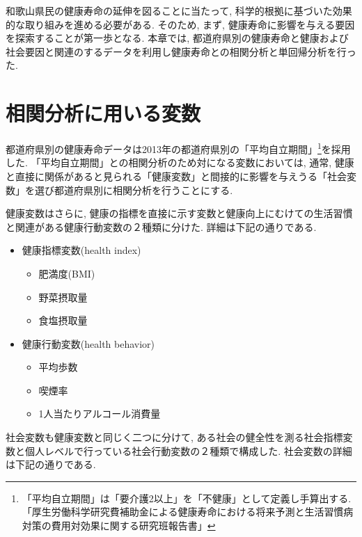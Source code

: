 和歌山県民の健康寿命の延伸を図ることに当たって, 科学的根拠に基づいた効果的な取り組みを進める必要がある. そのため, まず, 健康寿命に影響を与える要因を探索することが第一歩となる.
本章では, 都道府県別の健康寿命と健康および社会要因と関連のするデータを利用し健康寿命との相関分析と単回帰分析を行った.

\section{相関分析に用いる変数}
都道府県別の健康寿命データは2013年の都道府県別の「平均自立期間」\footnote{「平均自立期間」は「要介護2以上」を「不健康」として定義し手算出する. 「厚生労働科学研究費補助金による健康寿命における将来予測と生活習慣病対策の費用対効果に関する研究班報告書」}を採用した. 「平均自立期間」との相関分析のため対になる変数においては, 通常, 健康と直接に関係があると見られる「健康変数」と間接的に影響を与えうる「社会変数」を選び都道府県別に相関分析を行うことにする.

健康変数はさらに, 健康の指標を直接に示す変数と健康向上にむけての生活習慣と関連がある健康行動変数の２種類に分けた. 詳細は下記の通りである.
\begin{itemize} \setlength{\itemsep}{-0.5mm} \setlength{\parskip}{-0.5mm}
	\item 健康指標変数(health index)
	      \begin{itemize} \setlength{\itemsep}{-0.5mm} \setlength{\parskip}{-0.5mm}
		      \item 	肥満度(BMI)
		      \item 	野菜摂取量
		      \item 	食塩摂取量
	      \end{itemize}

	\item 健康行動変数(health behavior)
	      \begin{itemize} \setlength{\itemsep}{-0.5mm} \setlength{\parskip}{-0.5mm}
		      \item 	平均歩数
		      \item 	喫煙率
		      \item 	1人当たりアルコール消費量
	      \end{itemize}
\end{itemize}

社会変数も健康変数と同じく二つに分けて, ある社会の健全性を測る社会指標変数と個人レベルで行っている社会行動変数の２種類で構成した. 社会変数の詳細は下記の通りである.

